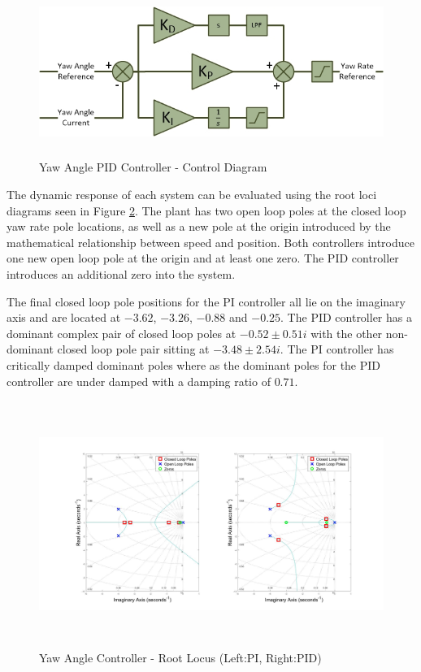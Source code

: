 \documentclass[12pt]{report}
\begin{document}
\begin{figure}[H]
	\centering
	\includegraphics[height = 5.5cm]{../References/Diagrams/YawAngleControllerPID.jpg}
	\caption{Yaw Angle PID Controller -  Control Diagram}
	\label{IM_YawAngleControllerPID}
\end{figure}

The dynamic response of each system can be evaluated using the root loci diagrams seen in Figure \ref{IM_YawAngleControlRoot}. The plant has two open loop poles at the closed loop yaw rate pole locations, as well as a new pole at the origin introduced by the mathematical relationship between speed and position. Both controllers introduce one new open loop pole at the origin and at least one zero. The PID controller introduces an additional zero into the system.  

The final closed loop pole positions for the PI controller all lie on the imaginary axis and are located at $-3.62$, $-3.26$, $-0.88$ and $-0.25$. The PID controller has a dominant complex pair of closed loop poles at $-0.52 \pm 0.51 i$ with the other non-dominant closed loop pole pair sitting at $-3.48 \pm 2.54 i$. The PI controller has critically damped dominant poles where as the dominant poles for the PID controller are under damped with a damping ratio of $0.71$.

\begin{figure}[H]
	\centering
	\includegraphics[height = 8cm]{../Design/Matlab/Controllers/yaw_angle_root.jpg}
	\caption{Yaw Angle Controller -  Root Locus (Left:PI, Right:PID)}
	\label{IM_YawAngleControlRoot}
\end{figure}
\end{document}

